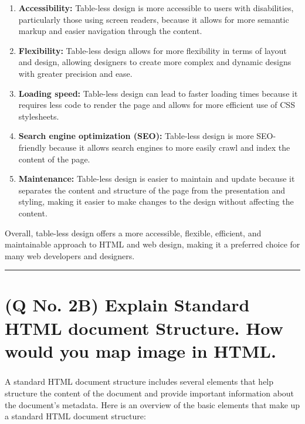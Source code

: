 \documentclass[11pt]{article}
\begin{document}
\begin{enumerate}
    \item \textbf{Accessibility:} Table-less design is more accessible to users with disabilities, particularly those using screen readers, because it allows for more semantic markup and easier navigation through the content.
    \item \textbf{Flexibility:} Table-less design allows for more flexibility in terms of layout and design, allowing designers to create more complex and dynamic designs with greater precision and ease.
    \item \textbf{Loading speed:} Table-less design can lead to faster loading times because it requires less code to render the page and allows for more efficient use of CSS stylesheets.
    \item \textbf{Search engine optimization (SEO):} Table-less design is more SEO-friendly because it allows search engines to more easily crawl and index the content of the page.
    \item \textbf{Maintenance:} Table-less design is easier to maintain and update because it separates the content and structure of the page from the presentation and styling, making it easier to make changes to the design without affecting the content.
\end{enumerate}

Overall, table-less design offers a more accessible, flexible, efficient, and maintainable approach to HTML and web design, making it a preferred choice for many web developers and designers.


\noindent\rule{\linewidth}{0.4pt}

\section{(Q No. 2B) Explain Standard HTML document Structure. How would you map image in HTML.}
\subparagraph{}
A standard HTML document structure includes several elements that help structure the content of the document and provide important information about the document's metadata. Here is an overview of the basic elements that make up a standard HTML document structure:
\end{document}
